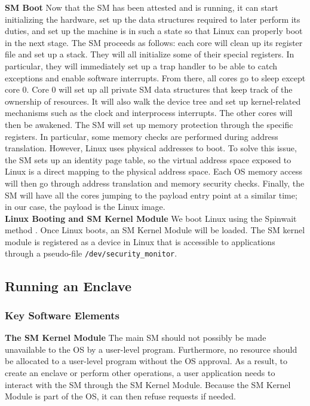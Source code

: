 \noindent\textbf{SM Boot}
Now that the SM has been attested and is running, it can start initializing the hardware, set up the data structures required to later perform its duties, and set up the machine is in such a state so that Linux can properly boot in the next stage.
The SM proceeds as follows: each core will clean up its register file and set up a stack.
They will all initialize some of their special registers.
In particular, they will immediately set up a trap handler to be able to catch exceptions and enable software interrupts.
From there, all cores go to sleep except core 0.
Core 0 will set up all private SM data structures that keep track of the ownership of resources.
It will also walk the device tree and set up kernel-related mechanisms such as the clock and interprocess interrupts.
The other cores will then be awakened.
The SM will set up memory protection through the specific registers.
In particular, some memory checks are performed during address translation.
However, Linux uses physical addresses to boot.
To solve this issue, the SM sets up an identity page table, so the virtual address space exposed to Linux is a direct mapping to the physical address space.
Each OS memory access will then go through address translation and memory security checks.
Finally, the SM will have all the cores jumping to the payload entry point at a similar time; in our case, the payload is the Linux image.
\\

\noindent\textbf{Linux Booting and SM Kernel Module} 
We boot Linux using the Spinwait method \cite{dabbelt2017all}.
Once Linux boots, an SM Kernel Module will be loaded.
The SM kernel module is registered as a device in Linux that is accessible to applications through a pseudo-file \texttt{/dev/security\_monitor}.

\subsection{Running an Enclave}

\subsubsection{Key Software Elements}
\noindent\textbf{The SM Kernel Module}
The main SM should not possibly be made unavailable to the OS by a user-level program.
Furthermore, no resource should be allocated to a user-level program without the OS approval.
As a result, to create an enclave or perform other operations,
a user application needs to interact with the SM through the SM Kernel Module.
Because the SM Kernel Module is part of the OS, it can then refuse requests if needed.
\\


